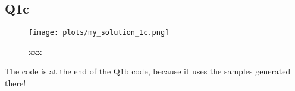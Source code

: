 \subsection{Q1c}

\begin{figure}[H]
    \centering
    \texttt{[image: plots/my\_solution\_1c.png]}
    \caption{xxx
    } \label{fig:1b}
\end{figure}

\noindent The code is at the end of the Q1b code, because it uses the samples generated there!
